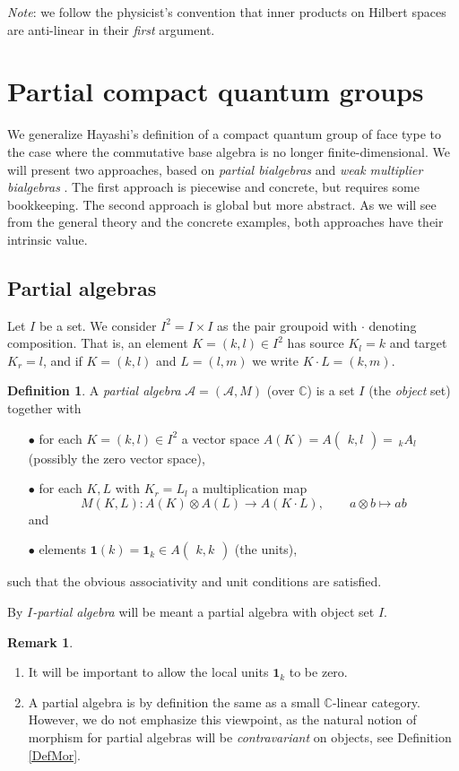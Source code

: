 \documentclass[10pt]{article}
\newcommand{\C}{\mathbb{C}}
\newcommand{\Grs}[3]{#1{\begin{pmatrix} #2,  #3\end{pmatrix}}}
\newcommand{\GrDA}[3]{{}_{\;#2}#1_{#3}} %
\newcommand{\Unit}{\mathbf{1}}
\newcommand{\wmult}{\cdot}
\theoremstyle{definition}
\newtheorem{Def}[Theorem]{Definition}
\newtheorem{Rem}[Theorem]{Remark}
\numberwithin{equation}{section}
\begin{document}
\emph{Note}: we follow the physicist's convention that inner products on Hilbert spaces are anti-linear in their \emph{first} argument. 


\section{Partial compact quantum groups}

We generalize Hayashi's definition of a compact quantum group of face type \cite{Hay1} to the case where the commutative base algebra is no longer finite-dimensional. We will present two approaches, based on \emph{partial bialgebras} and \emph{weak multiplier bialgebras} \cite{Boh1,VDW1}. The first approach is piecewise and concrete, but requires some bookkeeping. The second approach is global but more abstract. As we will see from the general theory and the concrete examples, both approaches have their intrinsic value.

\subsection{Partial algebras}

Let $I$ be a set. We consider $I^2=I\times I$ as the pair groupoid with $\wmult$ denoting composition. That is, an element $K=(k,l)\in I^2$ has source $K_l = k$ and target $K_r=l$, and if $K=(k,l)$ and $L=(l,m)$ we write $K\wmult L = (k,m)$. 

\begin{Def} A \emph{partial algebra} $\mathscr{A}=(\mathscr{A},M)$ (over $\C$) is a set $I$ (the \emph{object} set) together with 
\begin{itemize}
\item[$\bullet$] for each $K=(k,l)\in I^2$ a vector space $A(K) = \Grs{A}{k}{l}=\!\!\GrDA{A}{k}{l}$ (possibly the zero vector space),
\item[$\bullet$] for each $K,L$ with $K_r = L_l$ a multiplication map \[M(K,L):A(K) \otimes A(L)\rightarrow A(K\cdot L),\qquad a\otimes b \mapsto ab\]  and 
\item[$\bullet$] elements $\Unit(k) = \Unit_k \in \Grs{A}{k}{k}$ (the units), %
\end{itemize}
such that the obvious associativity and unit conditions are satisfied. 

By \emph{$I$-partial algebra} will be meant a partial algebra with object set $I$.
\end{Def}

\begin{Rem}
\begin{enumerate}\item It will be important to allow the local units $\Unit_k$ to be zero.
\item A partial algebra is by definition the same as a small $\C$-linear category. However, we do not emphasize this viewpoint, as the natural notion of morphism for partial algebras will be \emph{contravariant} on objects, see Definition \ref{DefMor}.%
\end{enumerate}
\end{Rem}
\end{document}
